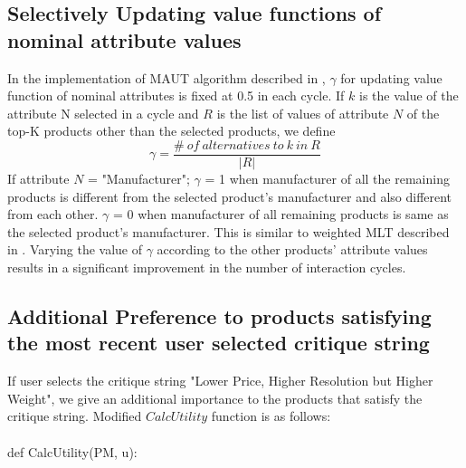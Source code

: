 \documentclass[10pt]{article}
\begin{document}
\subsection{Selectively Updating value functions of nominal attribute values}
In the implementation of MAUT algorithm described in \cite{zhang}, $\gamma$ for updating value function of nominal attributes is fixed at 0.5 in each cycle.
If $k$ is the value of the attribute N selected in a cycle and $R$ is the list of values of attribute $N$ of the top-K products other than the selected products, we define
\begin{equation}
\gamma = \frac{\#\: of\: alternatives\: to\: k\: in\: R}{|R|}
\end{equation}
If attribute $N$ = "Manufacturer"; $\gamma$ = 1 when manufacturer of all the remaining products is different from the selected product's manufacturer and also different from each other.
$\gamma$ = 0 when manufacturer of all remaining products is same as the selected product's manufacturer.
This is similar to weighted MLT described in \cite{wmlt}.
Varying the value of $\gamma$ according to the other products' attribute values results in a significant improvement in the number of interaction cycles.

\subsection{Additional Preference to products satisfying the most recent user selected critique string}
If user selects the critique string "Lower Price, Higher Resolution but Higher Weight", we give an additional importance to the products that satisfy the critique string. 
Modified $CalcUtility$ function is as follows:\\
\\
def CalcUtility(PM, u):\\
\noindent{}
\\
\\
\end{document}
